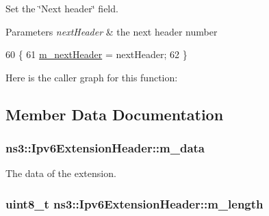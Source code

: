 Set the \char`\"{}\+Next header\char`\"{} field. 


\begin{DoxyParams}{Parameters}
{\em next\+Header} & the next header number \\
\hline
\end{DoxyParams}

\begin{DoxyCode}
60 \{
61   \hyperlink{classns3_1_1Ipv6ExtensionHeader_a17e21188b4094d59a1b194d20552ef2e}{m\_nextHeader} = nextHeader;
62 \}
\end{DoxyCode}


Here is the caller graph for this function\+:




\subsection{Member Data Documentation}
\subsubsection[{\texorpdfstring{m\+\_\+data}{m_data}}]{ ns3\+::\+Ipv6\+Extension\+Header\+::m\+\_\+data\hspace{0.3cm}{\ttfamily [private]}}\hypertarget{classns3_1_1Ipv6ExtensionHeader_a5d93365540e0de7501c630674b5f5b0b}{}\label{classns3_1_1Ipv6ExtensionHeader_a5d93365540e0de7501c630674b5f5b0b}


The data of the extension. 

\subsubsection[{\texorpdfstring{m\+\_\+length}{m_length}}]{\setlength{\rightskip}{0pt plus 5cm}uint8\+\_\+t ns3\+::\+Ipv6\+Extension\+Header\+::m\+\_\+length\hspace{0.3cm}{\ttfamily [protected]}}\hypertarget{classns3_1_1Ipv6ExtensionHeader_aebd490c06dfde17f84b92baa3349afc8}{}\label{classns3_1_1Ipv6ExtensionHeader_aebd490c06dfde17f84b92baa3349afc8}


